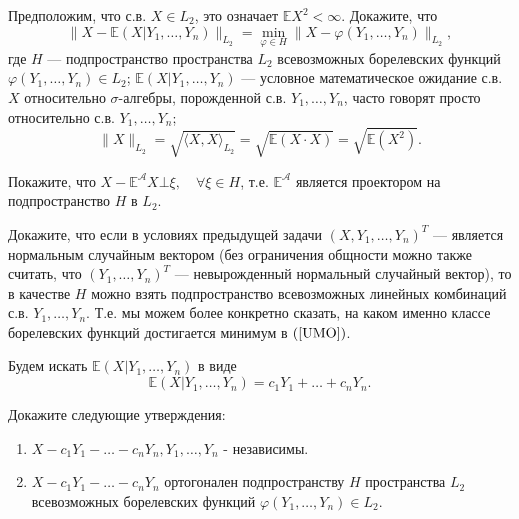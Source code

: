 \begin{problem}
Предположим, что с.в. $X\in L_2$, это означает ${\mathbb E}X^2<\infty$. Докажите, что 
\begin{equation}
\label{UMO}
\| X-{\mathbb E}(X|Y_1,\ldots,Y_n)\|_{L_2}=\min\limits_{\varphi\in H} \| X-\varphi(Y_1,\ldots,Y_n)\|_{L_2} , 
\end{equation}
где $H$ --- подпространство пространства $L_2$ всевозможных борелевских функций $\varphi(Y_1,\ldots,Y_n)\in L_2$; 
${\mathbb E}(X|Y_1,\ldots,Y_n)$ --- условное математическое ожидание с.в. $X$ относительно $\sigma$-алгебры, порожденной с.в. 
$Y_1,\ldots,Y_n$, часто говорят просто относительно с.в. $Y_1,\ldots,Y_n$; 
$$
\| X\|_{L_2}=\sqrt{\langle X,X\rangle_{L_2}}=\sqrt{{\mathbb E}(X\cdot X)}=\sqrt{{\mathbb E}(X^2)} . 
$$
\end{problem}

\begin{ordre}
Покажите, что $X-{\mathbb E}^{\mathcal A}X \bot \xi,\quad \forall\xi\in H$, т.е. ${\mathbb E}^{\mathcal A}$ 
является проектором на подпространство $H$ в $L_2$. 
\end{ordre}


\begin{problem}
Докажите, что если в условиях предыдущей задачи $(X,Y_1,\ldots,Y_n)^T$ --- является нормальным случайным вектором (без ограничения 
общности можно также считать, что $(Y_1,\ldots,Y_n)^T$  --- невырожденный нормальный случайный вектор), то в качестве $H$ можно взять 
подпространство всевозможных линейных комбинаций с.в. $Y_1,\ldots,Y_n$. Т.е. мы можем более конкретно сказать, на каком именно 
классе борелевских функций достигается минимум в $(\ref{UMO})$. 
\end{problem}

\begin{ordre}
Будем искать 
${\mathbb E}(X|Y_1,\ldots,Y_n)$ в виде 
\begin{equation}
\label{Gauss}
{\mathbb E}(X|Y_1,\ldots,Y_n)=c_1 Y_1+\ldots +c_n Y_n . 
\end{equation}

Докажите следующие утверждения:

\begin{enumerate}
\item $X-c_1 Y_1-\ldots-c_n Y_n, Y_1,\ldots, Y_n$ - независимы.
\item $X-c_1 Y_1-\ldots-c_n Y_n$ ортогонален подпространству $H$ пространства $L_2$ всевозможных борелевских функций $\varphi(Y_1,\ldots,Y_n)\in L_2$.
\end{enumerate}
 
\end{ordre}
